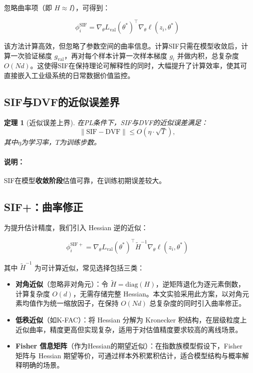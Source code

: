 \documentclass[12pt,a4paper]{ctexart}
\theoremstyle{definition}
\theoremstyle{plain}
\newtheorem{theorem}{定理}[section]
\begin{document}
忽略曲率项（即 \(H \approx I\)），可得到：

\begin{equation}
\phi_i^{\mathrm{SIF}} = \nabla_\theta L_{\mathrm{val}}(\theta^*)^\top \nabla_\theta \ell(z_i, \theta^*)
\label{eq:sif}
\end{equation}

该方法计算高效，但忽略了参数空间的曲率信息。计算SIF只需在模型收敛后，计算一次验证梯度 \(g_{\mathrm{val}}\)，再对每个样本计算一次样本梯度 \(g_i\) 并做内积，总复杂度 \(O(Nd)\)。这使得SIF在保持理论可解释性的同时，大幅提升了计算效率，使其可直接嵌入工业级系统的日常数据价值监控。

\subsection{SIF与DVF的近似误差界}
\label{sec:error_bound}

\begin{theorem}[近似误差上界]
在PL条件下，SIF与DVF的近似误差满足：
\[
\| \text{SIF} - \text{DVF} \| \le O(\eta \cdot \sqrt{T}),
\]
其中$\eta$为学习率，$T$为训练步数。
\end{theorem}

\paragraph{说明：}
SIF在模型\textbf{收敛阶段}估值可靠，在训练初期误差较大。

\subsection{SIF+：曲率修正}

为提升估计精度，我们引入 Hessian 逆的近似：

\begin{equation}
\phi_i^{\mathrm{SIF+}} = \nabla_\theta L_{\mathrm{val}}(\theta^*)^\top \tilde{H}^{-1} \nabla_\theta \ell(z_i, \theta^*)
\label{eq:sif_plus}
\end{equation}

其中 \(\tilde{H}^{-1}\) 为可计算近似，常见选择包括三类：

\begin{itemize}
    \item \textbf{对角近似}（忽略非对角元）：令 $\tilde{H} = \mathrm{diag}(H)$，逆矩阵退化为逐元素倒数，计算复杂度 $O(d)$，无需存储完整 Hessian。本文实验采用此方案，以对角元素均值作为统一缩放因子，在保持 $O(Nd)$ 总复杂度的同时引入曲率修正。
    \item \textbf{低秩近似}（如K-FAC）：将 Hessian 分解为 Kronecker 积结构，在层级粒度上近似曲率，精度更高但实现复杂，适用于对估值精度要求较高的离线场景。
    \item \textbf{Fisher 信息矩阵}（作为Hessian的期望近似）：在指数族模型假设下，Fisher 矩阵与 Hessian 期望等价，可通过样本外积累积估计，适合模型结构与概率解释明确的场景。
\end{itemize}
\end{document}
